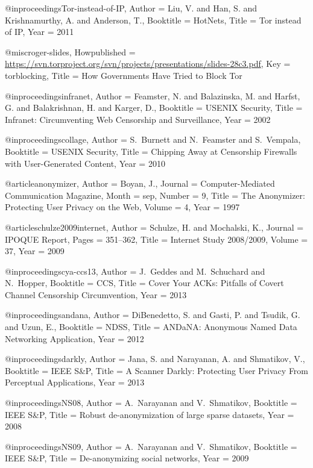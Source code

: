{{{{{	@inproceedings{Tor-instead-of-IP,
	Author = {Liu, V. and Han, S. and Krishnamurthy, A. and Anderson, T.},
	Booktitle = {HotNets},
	Title = {{Tor instead of IP}},
	Year = {2011}}
	
	@misc{roger-slides,
	Howpublished = {\url{https://svn.torproject.org/svn/projects/presentations/slides-28c3.pdf}},
	Key = {torblocking},
	Title = {{How Governments Have Tried to Block Tor}}}
	
	@inproceedings{infranet,
	Author = {Feamster, N. and Balazinska, M. and Harfst, G. and Balakrishnan, H. and Karger, D.},
	Booktitle = {USENIX Security},
	Title = {{Infranet: Circumventing Web Censorship and Surveillance}},
	Year = {2002}}
	
	@inproceedings{collage,
	Author = {S.~Burnett and N.~Feamster and S.~Vempala},
	Booktitle = {USENIX Security},
	Title = {{Chipping Away at Censorship Firewalls with User-Generated Content}},
	Year = {2010}}
	
	@article{anonymizer,
	Author = {Boyan, J.},
	Journal = {Computer-Mediated Communication Magazine},
	Month = sep,
	Number = {9},
	Title = {{The Anonymizer: Protecting User Privacy on the Web}},
	Volume = {4},
	Year = {1997}}
	
	@article{schulze2009internet,
	Author = {Schulze, H. and Mochalski, K.},
	Journal = {IPOQUE Report},
	Pages = {351--362},
	Title = {Internet Study 2008/2009},
	Volume = {37},
	Year = {2009}}
	
	@inproceedings{cya-ccs13,
	Author = {J.~Geddes and M.~Schuchard and N.~Hopper},
	Booktitle = {{CCS}},
	Title = {{Cover Your ACKs: Pitfalls of Covert Channel Censorship Circumvention}},
	Year = {2013}}
	
	@inproceedings{andana,
	Author = {DiBenedetto, S. and Gasti, P. and Tsudik, G. and Uzun, E.},
	Booktitle = {{NDSS}},
	Title = {{ANDaNA: Anonymous Named Data Networking Application}},
	Year = {2012}}
	
	@inproceedings{darkly,
	Author = {Jana, S. and Narayanan, A. and Shmatikov, V.},
	Booktitle = {IEEE S\&P},
	Title = {{A Scanner Darkly: Protecting User Privacy From Perceptual Applications}},
	Year = {2013}}
	
	@inproceedings{NS08,
	Author = {A.~Narayanan and V.~Shmatikov},
	Booktitle = {IEEE S\&P},
	Title = {Robust de-anonymization of large sparse datasets},
	Year = {2008}}
	
	@inproceedings{NS09,
	Author = {A.~Narayanan and V.~Shmatikov},
	Booktitle = {IEEE S\&P},
	Title = {De-anonymizing social networks},
	Year = {2009}}
	
}}}}}
